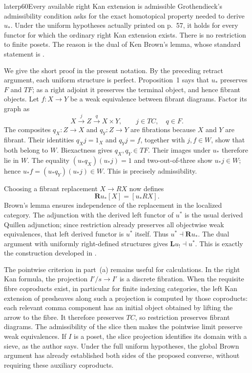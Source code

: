 \begin{dcomment}{later}{p60}{Every available right Kan extension is admissible}
Grothendieck's admissibility condition asks for the exact homotopical property needed to derive $u_*$. Under the uniform hypotheses actually printed on p.~57, it holds for every functor for which the ordinary right Kan extension exists. There is no restriction to finite posets. The reason is the dual of Ken Brown's lemma, whose standard statement is \citet[Lemma~1.1.12]{Hovey1999}.

We give the short proof in the present notation. By the preceding retract argument, each uniform structure is perfect. Proposition~1 says that $u_*$ preserves $F$ and $TF$; as a right adjoint it preserves the terminal object, and hence fibrant objects. Let $f:X\to Y$ be a weak equivalence between fibrant diagrams. Factor its graph as
\[
 X\xrightarrow{j}Z\xrightarrow{q}X\times Y,
 \qquad j\in TC,\quad q\in F.
\]
The composites $q_X:Z\to X$ and $q_Y:Z\to Y$ are fibrations because $X$ and $Y$ are fibrant. Their identities $q_Xj=1_X$ and $q_Yj=f$, together with $j,f\in W$, show that both belong to $W$. Biexactness gives $q_X,q_Y\in TF$. Their images under $u_*$ therefore lie in $W$. The equality $(u_*q_X)(u_*j)=1$ and two-out-of-three show $u_*j\in W$; hence $u_*f=(u_*q_Y)(u_*j)\in W$. This is precisely admissibility.

Choosing a fibrant replacement $X\to RX$ now defines
\[
 \mathbf R u_*[X]=[u_*RX].
\]
Brown's lemma ensures independence of the replacement in the localized category. The adjunction with the derived left functor of $u^*$ is the usual derived Quillen adjunction; since restriction already preserves all objectwise weak equivalences, that left derived functor is $u^*$ itself. Thus $u^*\dashv\mathbf R u_*$. The dual argument with uniformly right-defined structures gives $\mathbf L u_!\dashv u^*$. This is exactly the construction developed in \citet[Definition~1.3.6 and Lemma~1.3.10]{Hovey1999}.

The pointwise criterion in part~(a) remains useful for calculations. In the right Kan formula, the projection $I'/s\to I'$ is a discrete fibration. When the requisite fibre coproducts exist, in particular for finite indexing categories, the left Kan extension of presheaves along such a projection is computed by those coproducts: each relevant comma component has an initial object obtained by lifting the arrow to the fibre. It therefore preserves $TC$, so restriction preserves fibrant diagrams. The admissibility of the slice then makes the pointwise limit preserve weak equivalences. If $I$ is a poset, the slice projection identifies its domain with a sieve, as the author says. Under the full uniform hypotheses, the global Brown argument has already established both sides of the proposed converse, without requiring these auxiliary coproducts.


\end{dcomment}
